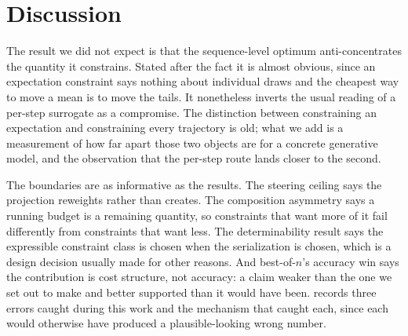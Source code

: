 \section{Discussion}
\label{sec:discussion}

The result we did not expect is that the sequence-level optimum anti-concentrates the
quantity it constrains. Stated after the fact it is almost obvious, since an expectation
constraint says nothing about individual draws and the cheapest way to move a mean is to move
the tails. It nonetheless inverts the usual reading of a per-step surrogate as a compromise. The distinction between constraining an expectation and constraining every
trajectory is old; what we add is a measurement of how far apart those
two objects are for a concrete generative model, and the observation that the per-step route
lands closer to the second.

The boundaries are as informative as the results. The steering ceiling says the
projection reweights rather than creates. The composition asymmetry says a running budget
is a remaining quantity, so constraints that want more of it fail differently from
constraints that want less. The determinability result says the expressible constraint
class is chosen when the serialization is chosen, which is a design decision usually made
for other reasons. And best-of-$n$'s accuracy win says the contribution is cost structure,
not accuracy: a claim weaker than the one we set out to make and better supported than it
would have been.  records three errors caught during
this work and the mechanism that caught each, since each would otherwise have produced a
plausible-looking wrong number.

